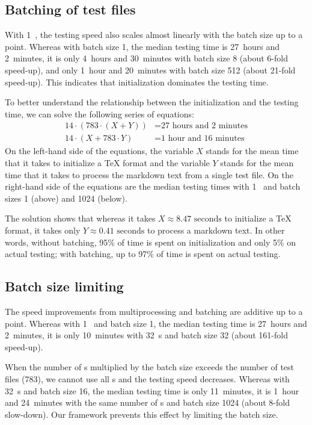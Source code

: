 \documentclass[final]{ltugboat}
\begin{document}
\subsection{Batching of test files}
With 1~, the testing speed also scales almost linearly with the batch size up to a point. Whereas with batch size 1, the median testing time is 27~hours and 2~minutes, it is only 4~hours and 30~minutes with batch size 8 (about 6-fold speed-up), and only 1~hour and 20~minutes with batch size 512 (about 21-fold speed-up). This indicates that initialization dominates the testing time.

To better understand the relationship between the initialization and the testing time, we can solve the following series of equations:
\begin{align*}
    14\cdot(783\cdot(X + Y)) &= \text{27 hours and 2 minutes} \\
    14\cdot(X + 783\cdot Y) &= \text{1 hour and 16 minutes}
\end{align*}
On the left-hand side of the equations, the variable $X$ stands for the mean time that it takes to initialize a \TeX{} format and the variable $Y$ stands for the mean time that it takes to process the markdown text from a single test file. On the right-hand side of the equations are the median testing times with 1~ and batch sizes 1 (above) and 1024 (below).

The solution shows that whereas it takes $X\approx\text{8.47 seconds}$ to initialize a \TeX{} format, it takes only $Y\approx\text{0.41 seconds}$ to process a markdown text. In other words, without batching, 95\% of time is spent on initialization and only 5\% on actual testing; with batching, up to 97\% of time is spent on actual testing.

\subsection{Batch size limiting}
The speed improvements from multiprocessing and batching are additive up to a point. Whereas with 1~ and batch size 1, the median testing time is 27~hours and 2~minutes, it is only 10~minutes with 32~s and batch size 32 (about 161-fold speed-up).

When the number of s multiplied by the batch size exceeds the number of test files (783), we cannot use all s and the testing speed decreases. Whereas with 32~s and batch size 16, the median testing time is only 11~minutes, it is 1~hour and 24~minutes with the same number of s and batch size 1024 (about 8-fold slow-down). Our framework prevents this effect by limiting the batch size.
\end{document}
